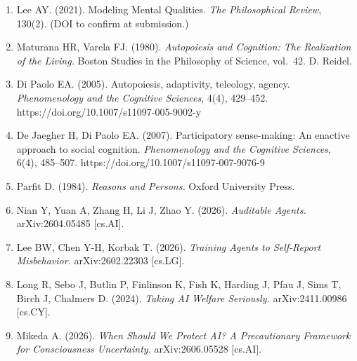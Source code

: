 \documentclass[
]{article}
\begin{document}
\begin{enumerate}
\item
  Lee AY. (2021). Modeling Mental Qualities. \emph{The Philosophical
  Review}, 130(2). (DOI to confirm at submission.)
\item
  Maturana HR, Varela FJ. (1980). \emph{Autopoiesis and Cognition: The
  Realization of the Living.} Boston Studies in the Philosophy of
  Science, vol.~42. D. Reidel.
\item
  Di Paolo EA. (2005). Autopoiesis, adaptivity, teleology, agency.
  \emph{Phenomenology and the Cognitive Sciences}, 4(4), 429--452.
  https://doi.org/10.1007/s11097-005-9002-y
\item
  De Jaegher H, Di Paolo EA. (2007). Participatory sense-making: An
  enactive approach to social cognition. \emph{Phenomenology and the
  Cognitive Sciences}, 6(4), 485--507.
  https://doi.org/10.1007/s11097-007-9076-9
\item
  Parfit D. (1984). \emph{Reasons and Persons.} Oxford University Press.
\item
  Nian Y, Yuan A, Zhang H, Li J, Zhao Y. (2026). \emph{Auditable
  Agents.} arXiv:2604.05485 {[}cs.AI{]}.
\item
  Lee BW, Chen Y-H, Korbak T. (2026). \emph{Training Agents to
  Self-Report Misbehavior.} arXiv:2602.22303 {[}cs.LG{]}.
\item
  Long R, Sebo J, Butlin P, Finlinson K, Fish K, Harding J, Pfau J, Sims
  T, Birch J, Chalmers D. (2024). \emph{Taking AI Welfare Seriously.}
  arXiv:2411.00986 {[}cs.CY{]}.
\item
  Mikeda A. (2026). \emph{When Should We Protect AI? A Precautionary
  Framework for Consciousness Uncertainty.} arXiv:2606.05528
  {[}cs.AI{]}.
\end{enumerate}
\end{document}
